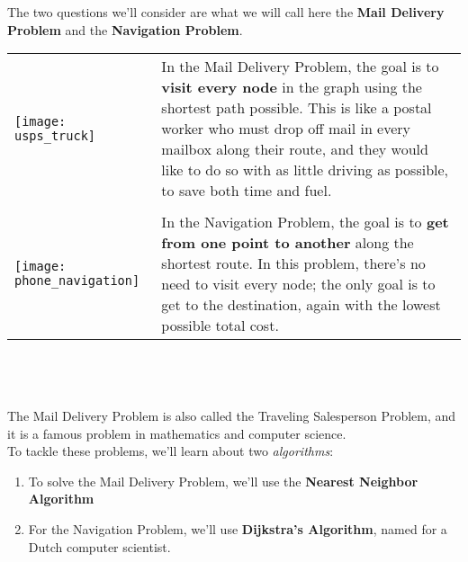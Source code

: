 The two questions we'll consider are what we will call here the \textbf{Mail Delivery Problem} and the \textbf{Navigation Problem}.\\

\begin{tabular}{l l}
\parbox[m]{0.15\textwidth}{\texttt{[image: usps\_truck]}}
& \parbox[m]{0.7\textwidth}{In the Mail Delivery Problem, the goal is to \textbf{visit every node} in the graph using the shortest path possible.  This is like a postal worker who must drop off mail in every mailbox along their route, and they would like to do so with as little driving as possible, to save both time and fuel.}
\\
& \\
\parbox[m]{0.15\textwidth}{\texttt{[image: phone\_navigation]}}
& \parbox[m]{0.7\textwidth}{In the Navigation Problem, the goal is to \textbf{get from one point to another} along the shortest route.  In this problem, there's no need to visit every node; the only goal is to get to the destination, again with the lowest possible total cost.}
\end{tabular}\\ \\ \\
The Mail Delivery Problem is also called the Traveling Salesperson Problem, and it is a famous problem in mathematics and computer science.\\

To tackle these problems, we'll learn about two \emph{algorithms}:
\begin{enumerate}
\item To solve the Mail Delivery Problem, we'll use the \textbf{Nearest Neighbor Algorithm}
\item For the Navigation Problem, we'll use \textbf{Dijkstra's Algorithm}, named for a Dutch computer scientist.
\end{enumerate}

